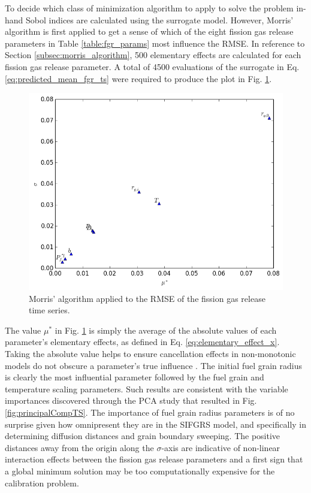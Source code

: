 To decide which class of minimization algorithm to apply to solve the problem in-hand Sobol indices are calculated using the surrogate model. However, Morris' algorithm is first applied to get a sense of which of the eight fission gas release parameters in Table \ref{table:fgr_params} most influence the \ac{RMSE}. In reference to Section \ref{subsec:morris_algorithm}, 500 elementary effects are calculated for each fission gas release parameter. A total of 4500 evaluations of the surrogate in Eq. \ref{eq:predicted_mean_fgr_ts} were required to produce the plot in Fig. \ref{fig:fgr_morris_plot}.    
\begin{figure}[!h]
\caption{\label{fig:fgr_morris_plot}
Morris' algorithm applied to the \ac{RMSE} of the fission gas release time series.}
 \begin{center}
  \includegraphics[scale=.75]{./Chapter4/fgr_morris.png}
 \end{center}
\end{figure}
The value $\mu^*$ in Fig. \ref{fig:fgr_morris_plot} is simply the average of the absolute values of each parameter's elementary effects, as defined in Eq. \ref{eq:elementary_effect_x}. Taking the absolute value helps to ensure cancellation effects in non-monotonic models do not obscure a parameter's true influence \cite{Morris}. The initial fuel grain radius is clearly the most influential parameter followed by the fuel grain and temperature scaling parameters. Such results are consistent with the variable importances discovered through the \ac{PCA} study that resulted in Fig. \ref{fig:principalCompTS}. The importance of fuel grain radius parameters is of no surprise given how omnipresent they are in the \ac{SIFGRS} model, and specifically in determining diffusion distances and grain boundary sweeping. The positive distances away from the origin along the $\sigma$-axis are indicative of non-linear interaction effects between the fission gas release parameters and a first sign that a global minimum solution may be too computationally expensive for the calibration problem.  

